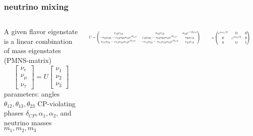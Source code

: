 \documentclass{beamer}
\begin{document}
	\begin{frame}
		\frametitle{neutrino mixing}
			\begin{columns}
			A given flavor eigenstate is a linear combination of mass eigenstates (PMNS-matrix)
			\begin{equation*}
			\begin{bmatrix}
			\nu_e \\
			\nu_{\mu} \\
			\nu_{\tau}
			\end{bmatrix}
			= U
			\begin{bmatrix}
			\nu_1 \\
			\nu_2 \\
			\nu_3
			\end{bmatrix}
			\end{equation*}			
			parameters: angles $\theta_{12},\theta_{13},\theta_{23}$ CP-violating phases $\delta_{CP}, \alpha_1, \alpha_2$, and neutrino masses $m_1, m_2, m_3$
			 
			\begin{equation*}		
			\resizebox{5.7cm}{!}{$U = \begin{pmatrix}
			c_{12}c_{13} & s_{12}c_{13} & s_{13}e^{-i\delta_{CP}} \\
			-s_{12}c_{23}-c_{12}s_{23}s_{13}e^{i\delta_{CP}} & c_{12}c_{23}-s_{12}s_{23}s_{13}e^{i\delta_{CP}}
			& s_{23}c_{13} \\ s_{12}s_{23}-c_{12}c_{23}s_{13}e^{i\delta_{CP}} & 
			-c_{12}s_{23}-s_{12}c_{23}s_{13}e^{i\delta_{CP}} & c_{23}c_{13}
			\end{pmatrix}$}
			\end{equation*}
			
			\begin{equation*}
			\resizebox{2cm}{!}{$
			\times 
			\begin{pmatrix}
			e^{i\alpha_1 /2} & 0 & 0 \\
			0 & e^{i\alpha_2 /2} & 0 \\
			0 & 0 & 1
			\end{pmatrix}$}
			\end{equation*}
			
			\end{columns}
	\end{frame}
	
\end{document}
